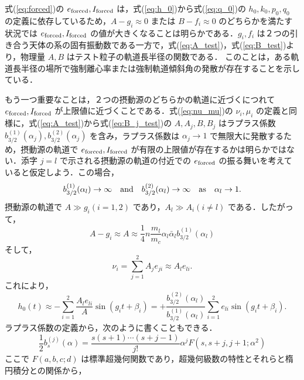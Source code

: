 \documentclass[11pt,a4paper,oneside,onecolumn]{jreport}
\begin{document}
式(\ref{eq:forced})の $e_{\rm forced}, I_{\rm forced}$ は，式(\ref{eq:h_0})から式(\ref{eq:q_0})の $h_0, k_0, p_0, q_0$ の定義に依存しているため，$A - g_i \approx 0$ または $B - f_i \approx 0$ のどちらかを満たす状況では $e_{\rm forced}, I_{\rm forced}$ の値が大きくなることは明らかである．$g_i, f_i$ は２つの引き合う天体の系の固有振動数である一方で，式(\ref{eq:A_test})，式(\ref{eq:B_test})より，物理量 $A, B$ はテスト粒子の軌道長半径の関数である． このことは，ある軌道長半径の場所で強制離心率または強制軌道傾斜角の発散が存在することを示している．

もう一つ重要なことは，２つの摂動源のどちらかの軌道に近づくにつれて $e_{\rm forced}, I_{\rm forced}$ が上限値に近づくことである．式(\ref{eq:nu_mu})の $\nu_i, \mu_i$ の定義と同様に，式(\ref{eq:A_test})から式(\ref{eq:B_j_test})の $A, A_j, B, B_j$ はラプラス係数 $b_{3/2}^{(1)} (\alpha_j), b_{3/2}^{(2)} (\alpha_j)$ を含み，ラプラス係数は $\alpha_j \rightarrow 1$ で無限大に発散するため，摂動源の軌道で $e_{\rm forced}, I_{\rm forced}$ が有限の上限値が存在するかは明らかではない．添字 $j = l$ で示される摂動源の軌道の付近での $e_{\rm forced}$ の振る舞いを考えていると仮定しよう．この場合，
\begin{equation}
b_{3/2}^{(1)} (\alpha_l) \rightarrow \infty \quad {\rm and} \quad b_{3/2}^{(2)} (\alpha_l) \rightarrow \infty \quad {\rm as} \quad \alpha_l \rightarrow 1.
\end{equation}
摂動源の軌道で $A \gg g_i (i = 1, 2)$ であり，$A_l \gg A_i (i \not= l)$ である．したがって，
\begin{equation}
A - g_i \approx A \approx \frac{1}{4} n \frac{m_l}{m_c} \alpha_l \bar{\alpha}_l b_{3/2}^{(1)} (\alpha_l)
\end{equation}
そして，
\begin{equation}
\nu_i = \sum_{j = 1}^{2} A_j e_{ji} \approx A_l e_{li}.
\end{equation}
これにより，
\begin{equation}
h_0 (t) \approx - \sum_{i = 1}^{2} \frac{A_l e_{li}}{A} \sin (g_i t + \beta_i) = + \frac{b_{3/2}^{(2)} (\alpha_l)}{b_{3/2}^{(1)} (\alpha_l)} \sum_{i = 1}^{2} e_{li} \sin (g_i t + \beta_i).
\end{equation}
ラプラス係数の定義から，次のように書くこともできる．
\begin{equation}
\frac{1}{2} b_{s}^{(j)} (\alpha) = \frac{s (s + 1) \cdots (s + j - 1)}{j !} \alpha^j F (s, s + j, j + 1; \alpha^2)
\end{equation}
ここで $F (a, b, c; d)$ は標準超幾何関数であり，超幾何級数の特性とそれらと楕円積分との関係から，
\end{document}
